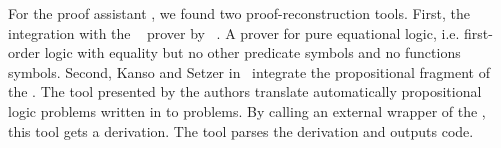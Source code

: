 \documentclass[../main.tex]{subfiles}
\begin{document}
For the proof assistant \Agda, we found two proof-reconstruction tools.
First, the integration with the ~\cite{hillenbrand1997}
prover by \citeauthor{foster2011integrating}~\cite{foster2011integrating}.
A prover for pure equational logic, i.e.
first-order logic with equality but no other predicate symbols and no
functions symbols.
Second, Kanso and Setzer in~\cite{kanso2016light} integrate the propositional
fragment of the . The tool presented by the authors
translate automatically propositional logic problems written in \Agda
to \TPTP problems. By calling an external wrapper of the \ATP, this
tool gets a \TSTP derivation. The tool parses the 
derivation and outputs \Agda code.
\end{document}
